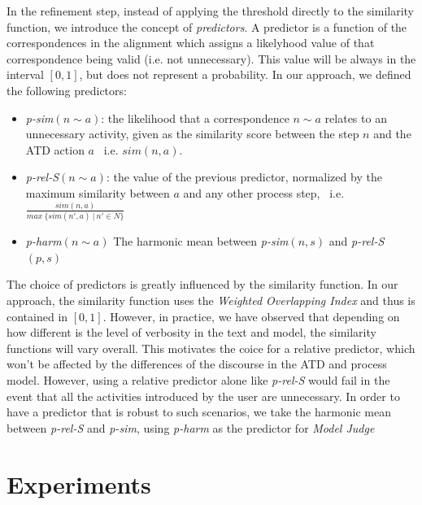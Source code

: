 In the refinement step, instead of applying the threshold directly to the
similarity function, we introduce the concept of \emph{predictors}. A predictor
is a function of the correspondences in the alignment which assigns a likelyhood
value of that correspondence being valid (i.e. not unnecessary). This value will
be always in the interval $[0,1]$, but does not represent a probability. In our
approach, we defined the following predictors:

\begin{itemize}
	\item \textit{p-sim}$(n \sim a)$: the likelihood that a correspondence $n \sim a$
    relates to an unnecessary activity, given as the similarity score between
    the step $n$ and the ATD action $a$~ i.e. $sim(n,a)$.
    
	\item \textit{p-rel-S}$(n \sim a)$: the value of the previous predictor,
    normalized by the maximum similarity between $a$ and any other process step,
    ~i.e. \\ $\frac{sim(n,a)}{max~\{sim(n', a)~|~n' \in N\}}$
    
  \item \textit{p-harm}$(n \sim a)$ The harmonic mean between \textit{p-sim}$(n,
    s)$ and \textit{p-rel-S}$(p,s)$
\end{itemize}


The choice of predictors is greatly influenced by the similarity function. In
our approach, the similarity function uses the \emph{Weighted Overlapping Index}
and thus is contained in $[0,1]$. However, in practice, we have observed that
depending on how different is the level of verbosity in the text and model, the
similarity functions will vary overall. This motivates the coice for a relative
predictor, which won't be affected by the differences of the discourse in the ATD and
process model. However, using a relative predictor alone like \textit{p-rel-S} would
fail in the event that all the activities introduced by the user are
unnecessary. In order to have a predictor that is robust to such scenarios, we
take the harmonic mean between \textit{p-rel-S} and \textit{p-sim}, using
\textit{p-harm} as the predictor for \emph{Model Judge}


 



\section{Experiments}
\label{sec:modeljudge_results}

